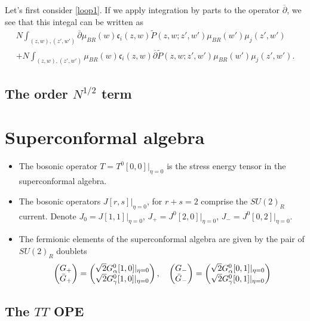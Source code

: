 \documentclass[11pt]{amsart}
\newcommand{\dbar}{\br{\partial}}
\newcommand{\til}{\widetilde}
\newcommand{\br}{\overline}
\newcommand{\mf}{\mathfrak}
\theoremstyle{thm}
\numberwithin{equation}{subsection}
\theoremstyle{def}
\theoremstyle{rem}
\newcommand{\fc}{\mf{c}}
\begin{document}
Let's first consider \eqref{loop1}.
If we apply integration by parts to the operator $\dbar$, we see that this integal can be written as  
\begin{multline}
N \int_{(z,w), (z',w')} \dbar \mu_{BR} (w) \fc_{i}(z,w) \til P(z , w ; z', w') \mu_{BR}(w') \mu_{j}(z',w') \\
+ N \int_{(z,w), (z',w')} \mu_{BR} (w) \fc_{i}(z,w) \dbar \til P(z , w ; z', w') \mu_{BR}(w') \mu_{j}(z',w') .
\end{multline}

\subsection{The order $N^{1/2}$ term}


\section{Superconformal algebra}

\begin{itemize}
\item The bosonic operator $T = T^0 [0,0]|_{\eta = 0}$ is the stress energy tensor in the superconformal algebra. 
\item The bosonic operators $J [r,s]|_{\eta = 0}$, for $r + s = 2$ comprise the $SU(2)_R$ current.
Denote $J_0 = J [1,1]|_{\eta = 0}$, $J_+ = J^0 [2,0]|_{\eta = 0}$, $J_- = J^0[0,2]|_{\eta = 0}$. 
\item The fermionic elements of the superconformal algebra are given by the pair of $SU(2)_R$ doublets 
\[
\begin{pmatrix} G_+ \\ \Bar{G}_+ \end{pmatrix} = \begin{pmatrix} \sqrt{2} G^0_\alpha [1,0]|_{\eta = 0} \\ \sqrt{2} G^0_\gamma [1,0]|_{\eta = 0} \end{pmatrix} , \quad \begin{pmatrix} G_- \\ \Bar{G}_- \end{pmatrix} = \begin{pmatrix} \sqrt{2} G^0_\alpha [0,1]|_{\eta = 0} \\ \sqrt{2} G^0_\gamma [0,1]|_{\eta = 0} \end{pmatrix}
\]
\end{itemize}


\subsection{The $TT$ OPE}
\end{document}
